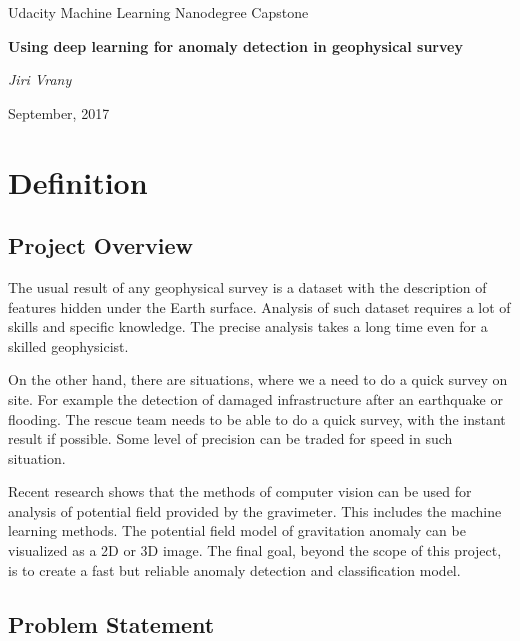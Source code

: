 \documentclass{article}
\begin{document}
\begin{titlepage}
    \begin{center}
        \Large{Udacity Machine Learning Nanodegree Capstone}

        \LARGE\textbf{Using deep learning for anomaly detection in geophysical survey}

        \vspace{1cm}
        \large\textit{Jiri Vrany}

        \normalsize{September, 2017}
    \end{center}
\end{titlepage}


\section{Definition}\label{i.-definition}

\subsection{Project Overview}\label{project-overview}

The usual result of any geophysical survey is a dataset with the
description of features hidden under the Earth surface. Analysis of such
dataset requires a lot of skills and specific knowledge. The precise
analysis takes a long time even for a skilled geophysicist.

On the other hand, there are situations, where we a need to do a quick
survey on site. For example the detection of damaged infrastructure
after an earthquake or flooding. The rescue team needs to be able to do
a quick survey, with the instant result if possible. Some level of
precision can be traded for speed in such situation.

Recent research shows that the methods of computer vision can be used
for analysis of potential field provided by the gravimeter. This
includes the machine learning methods. The potential field model of
gravitation anomaly \cite{salem}
can be visualized as a 2D or 3D image. The final goal, beyond the scope
of this project, is to create a fast but reliable anomaly detection and
classification model.

\subsection{Problem Statement}\label{problem-statement}
\end{document}

